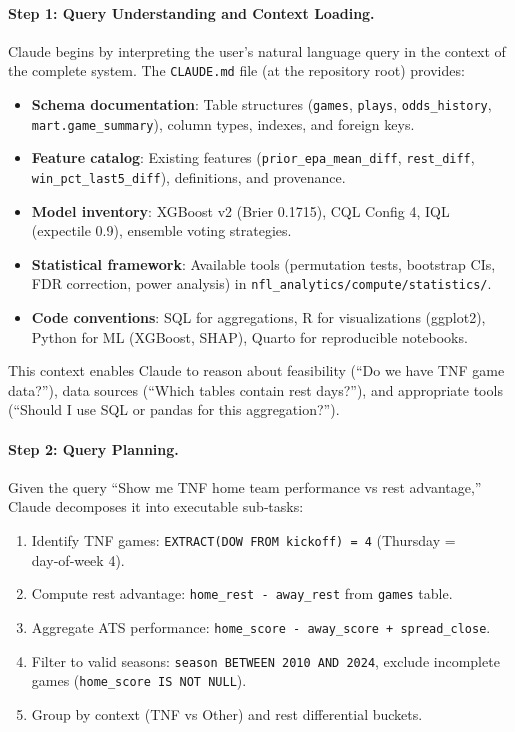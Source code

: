 \paragraph{Step 1: Query Understanding and Context Loading.}
Claude begins by interpreting the user's natural language query in the context of the complete system. The \texttt{CLAUDE.md} file (at the repository root) provides:
\begin{itemize}
\item \textbf{Schema documentation}: Table structures (\texttt{games}, \texttt{plays}, \texttt{odds\_history}, \texttt{mart.game\_summary}), column types, indexes, and foreign keys.
\item \textbf{Feature catalog}: Existing features (\texttt{prior\_epa\_mean\_diff}, \texttt{rest\_diff}, \texttt{win\_pct\_last5\_diff}), definitions, and provenance.
\item \textbf{Model inventory}: XGBoost v2 (Brier 0.1715), CQL Config 4, IQL (expectile 0.9), ensemble voting strategies.
\item \textbf{Statistical framework}: Available tools (permutation tests, bootstrap CIs, FDR correction, power analysis) in \texttt{nfl\_analytics/compute/statistics/}.
\item \textbf{Code conventions}: SQL for aggregations, R for visualizations (ggplot2), Python for ML (XGBoost, SHAP), Quarto for reproducible notebooks.
\end{itemize}

This context enables Claude to reason about feasibility (``Do we have TNF game data?''), data sources (``Which tables contain rest days?''), and appropriate tools (``Should I use SQL or pandas for this aggregation?'').

\paragraph{Step 2: Query Planning.}
Given the query ``Show me TNF home team performance vs rest advantage,'' Claude decomposes it into executable sub‑tasks:
\begin{enumerate}
\item Identify TNF games: \texttt{EXTRACT(DOW FROM kickoff) = 4} (Thursday = day‑of‑week 4).
\item Compute rest advantage: \texttt{home\_rest - away\_rest} from \texttt{games} table.
\item Aggregate ATS performance: \texttt{home\_score - away\_score + spread\_close}.
\item Filter to valid seasons: \texttt{season BETWEEN 2010 AND 2024}, exclude incomplete games (\texttt{home\_score IS NOT NULL}).
\item Group by context (TNF vs Other) and rest differential buckets.
\end{enumerate}

